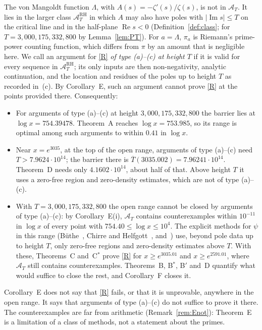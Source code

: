 \documentclass{amsart}
\theoremstyle{definition}
\theoremstyle{remark}
\theoremstyle{plain}
\numberwithin{equation}{section}
\newcommand{\HRH}{3{,}000{,}175{,}332{,}800}
\newcommand{\cA}{\mathcal{A}}
\newcommand{\cARH}{\mathcal{A}^{\mathrm{RH}}}
\newcommand{\Tb}{\overline{T}}
\newcommand{\TDhyp}{4.1602\cdot10^{14}}
\newcommand{\Cstar}{C$^*$}
\newcommand{\Bp}{B$'$}
\newcommand{\Bstar}{B$^*$}
\begin{document}
The von Mangoldt function $\Lambda$, with $A(s)=-\zeta'(s)/\zeta(s)$, is not in $\cA_T$. It lies in the larger class $\cARH_T$ in which $A$ may also have poles with $|\operatorname{Im}s|\le T$ on the critical line and in the half-plane $\operatorname{Re}s<0$ (Definition~\ref{def:class}; for $T=\HRH$ by Lemma~\ref{lem:PT}). For $a=\Lambda$, $\pi_a$ is Riemann's prime-power counting function, which differs from $\pi$ by an amount that is negligible here. We call an argument for \eqref{R} \emph{of type (a)--(c) at height $T$} if it is valid for every sequence in $\cARH_T$; its only inputs are then non-negativity, analytic continuation, and the location and residues of the poles up to height $T$ as recorded in~(c). By Corollary~E, such an argument cannot prove \eqref{R} at the points provided there. Consequently:
\begin{itemize}
\item For arguments of type (a)--(c) at height $\HRH$ the barrier lies at $\log x=754.39478$. Theorem~A reaches $\log x=753.985$, so its range is optimal among such arguments to within $0.41$ in $\log x$.
\item Near $x=e^{3035}$, at the top of the open range, arguments of type (a)--(c) need $T>7.9624\cdot10^{14}$; the barrier there is $\Tb(3035.002)=7.96241\cdot10^{14}$. Theorem~D needs only $\TDhyp$, about half of that. Above height $T$ it uses a zero-free region and zero-density estimates, which are not of type (a)--(c).
\item With $T=\HRH$ the open range cannot be closed by arguments of type (a)--(c): by Corollary~E(i), $\cA_T$ contains counterexamples within $10^{-11}$ in $\log x$ of every point with $754.40\le\log x\le10^4$. The explicit methods for $\psi$ in this range (B\"uthe~\cite{But16}, Chirre and Helfgott~\cite{CH25}, and~\cite{BKLNW21,FKS23}) use, beyond pole data up to height $T$, only zero-free regions and zero-density estimates above $T$. With these, Theorems~C and~\Cstar{} prove \eqref{R} for $x\ge e^{3035.01}$ and $x\ge e^{2591.01}$, where $\cA_T$ still contains counterexamples. Theorems~B, \Bstar, \Bp{} and~D quantify what would suffice to close the rest, and Corollary~F closes it.
\end{itemize}
Corollary~E does not say that \eqref{R} fails, or that it is unprovable, anywhere in the open range. It says that arguments of type (a)--(c) do not suffice to prove it there. The counterexamples are far from arithmetic (Remark~\ref{rem:Enot}): Theorem~E is a limitation of a class of methods, not a statement about the primes.
\end{document}
